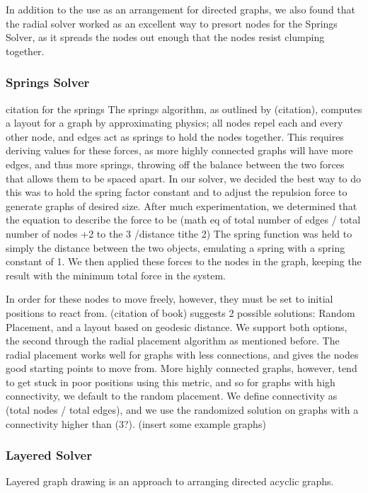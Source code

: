 \documentclass{article}
\begin{document}
In addition to the use as an arrangement for directed graphs, we also found that the radial solver worked as an excellent way to presort nodes for the
Springs Solver, as it spreads the nodes out enough that the nodes resist clumping together.

\subsubsection{Springs Solver}
citation for the springs\cite{springs}
The springs algorithm, as outlined by (citation), computes a layout for a graph by approximating physics; all nodes repel each and every other node, 
and edges act as springs to hold the nodes together. This requires deriving values for these forces, as more highly connected graphs will have 
more edges, and thus more springs, throwing off the balance between the two forces that allows them to be spaced apart. In our solver, we decided
the best way to do this was to hold the spring factor constant and to adjust the repulsion force to generate graphs of desired size. After much 
experimentation, we determined that the equation to describe the force to be (math eq of total number of edges / total number of nodes +2 to the 3 /distance tithe 2)
The spring function was held to simply the distance between the two objects, emulating a spring with a spring constant of 1. We then applied these forces
to the nodes in the graph, keeping the result with the minimum total force in the system.

In order for these nodes to move freely, however, they must be set to initial positions to react from. (citation of book) suggests 2 possible solutions: 
Random Placement, and a layout based on geodesic distance. We support both options, the second through the radial placement algorithm as mentioned before.
The radial placement works well for graphs with less connections, and gives the nodes good starting points to move from. More highly connected graphs,
however, tend to get stuck in poor positions using this metric, and so for graphs with high connectivity, we default to the random placement. We define 
connectivity as (total nodes / total edges), and we use the randomized solution on graphs with a connectivity higher than (3?).
(insert some example graphs)

\subsubsection{Layered Solver}
Layered graph drawing is an approach to arranging directed acyclic graphs.
\end{document}
